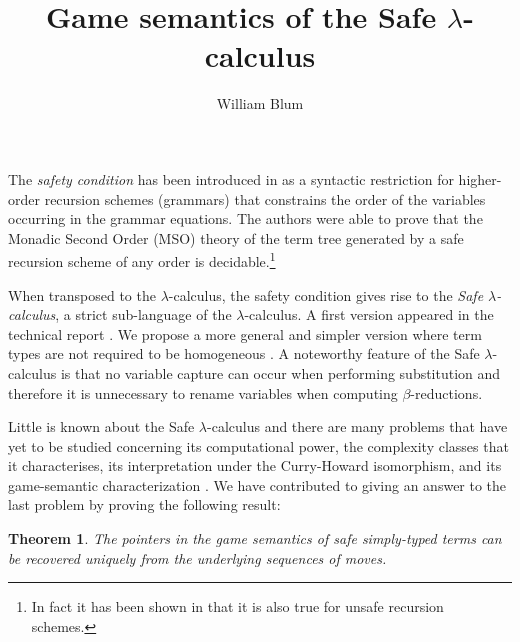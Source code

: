 
\newcommand\ialgol{\textsf{IA}}
\newcommand\pcf{\textsf{PCF}}
\newtheorem{thm}{Theorem}
\pagestyle{empty}



\title{Game semantics of the Safe $\lambda$-calculus}

\author{William Blum}

\maketitle

\vspace{0.5cm}


\noindent The \emph{safety condition} has been introduced in
\cite{KNU02} as a syntactic restriction for higher-order recursion
schemes (grammars) that constrains the order of the variables
occurring in the grammar equations. The authors were able to prove
that the Monadic Second Order (MSO) theory of the term tree
generated by a safe recursion scheme of any order is
decidable.\footnote{In fact it has been shown in \cite{OngLics2006}
that it is also true for unsafe recursion schemes.}

When transposed to the $\lambda$-calculus, the safety condition
gives rise to the \emph{Safe $\lambda$-calculus}, a strict
sub-language of the $\lambda$-calculus. A first version appeared in
the technical report \cite{safety-mirlong2004}. We propose a more
general and simpler version where term types are not required to be
homogeneous \cite{blumtransfer}. A noteworthy feature of the Safe
$\lambda$-calculus is that no variable capture can occur when
performing substitution and therefore it is unnecessary to rename
variables when computing $\beta$-reductions.

Little is known about the Safe $\lambda$-calculus and there are many
 problems that have yet to be studied concerning its
computational power, the complexity classes that it characterises,
its interpretation under the Curry-Howard isomorphism, and its
game-semantic characterization
\cite{abramsky:game-semantics-tutorial}. We have contributed to
giving an answer to the last problem by proving the following
result:
\begin{thm}
\label{thm:safeptrrecover} The pointers in the game semantics of
safe simply-typed terms can be recovered uniquely from the
underlying sequences of moves.
\end{thm}

